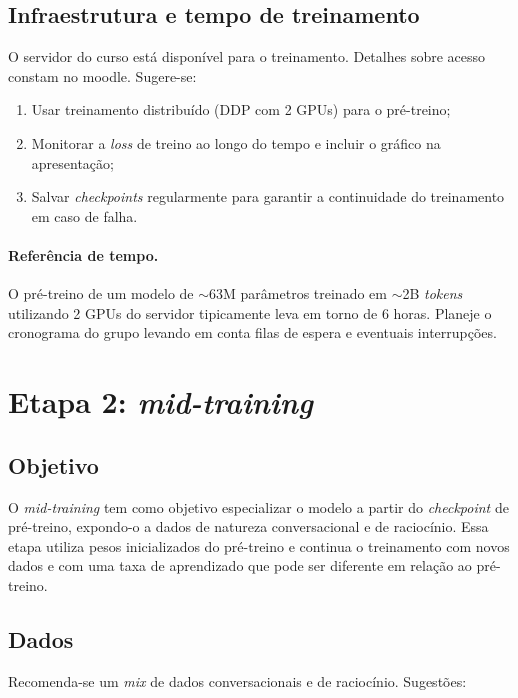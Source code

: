 \documentclass{dlproblemset}
\begin{document}
\subsection*{Infraestrutura e tempo de treinamento}

O servidor do curso está disponível para o treinamento. Detalhes sobre acesso constam no moodle. Sugere-se:

\begin{enumerate}[1)]
    \item Usar treinamento distribuído (DDP com 2 GPUs) para o pré-treino;
    \item Monitorar a \textit{loss} de treino ao longo do tempo e incluir o gráfico na apresentação;
    \item Salvar \textit{checkpoints} regularmente para garantir a continuidade do treinamento em caso de falha.
\end{enumerate}

\paragraph{Referência de tempo.} O pré-treino de um modelo de $\sim$63M parâmetros treinado em $\sim$2B \textit{tokens} utilizando 2 GPUs do servidor tipicamente leva em torno de 6 horas. Planeje o cronograma do grupo levando em conta filas de espera e eventuais interrupções.

\section*{Etapa 2: \textit{mid-training}}

\subsection*{Objetivo}

O \textit{mid-training} tem como objetivo especializar o modelo a partir do \textit{checkpoint} de pré-treino, expondo-o a dados de natureza conversacional e de raciocínio. Essa etapa utiliza pesos inicializados do pré-treino e continua o treinamento com novos dados e com uma taxa de aprendizado que pode ser diferente em relação ao pré-treino.

\subsection*{Dados}

Recomenda-se um \textit{mix} de dados conversacionais e de raciocínio. Sugestões:
\end{document}
